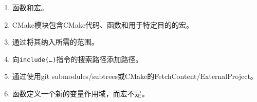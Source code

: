 

\begin{enumerate}
\item 
函数和宏。

\item
CMake模块包含CMake代码、函数和用于特定目的的宏。

\item 
通过将其纳入所需的范围。

\item 
向\texttt{include(…)}指令的搜索路径添加路径。

\item 
通过使用git submodules/subtrees或CMake的FetchContent/ExternalProject。

\item 
函数定义一个新的变量作用域，而宏不是。
\end{enumerate}